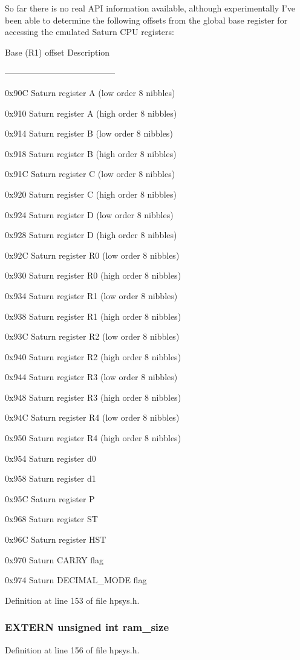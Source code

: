 So far there is no real API information available, although experimentally I've been able to determine the following offsets from the global base register for accessing the emulated Saturn CPU registers:\par


Base (R1) offset Description\par
 ---------------------------------------

0x90C Saturn register A (low order 8 nibbles)\par
 0x910 Saturn register A (high order 8 nibbles)\par
  0x914 Saturn register B (low order 8 nibbles)\par
  0x918 Saturn register B (high order 8 nibbles)\par
  0x91C Saturn register C (low order 8 nibbles)\par
  0x920 Saturn register C (high order 8 nibbles)\par
  0x924 Saturn register D (low order 8 nibbles)\par
  0x928 Saturn register D (high order 8 nibbles)\par
  \par
 0x92C Saturn register R0 (low order 8 nibbles)\par
  0x930 Saturn register R0 (high order 8 nibbles)\par
  0x934 Saturn register R1 (low order 8 nibbles)\par
  0x938 Saturn register R1 (high order 8 nibbles)\par
  0x93C Saturn register R2 (low order 8 nibbles)\par
  0x940 Saturn register R2 (high order 8 nibbles)\par
  0x944 Saturn register R3 (low order 8 nibbles)\par
  0x948 Saturn register R3 (high order 8 nibbles)\par
  0x94C Saturn register R4 (low order 8 nibbles)\par
  0x950 Saturn register R4 (high order 8 nibbles)\par
  \par
 0x954 Saturn register d0\par
 0x958 Saturn register d1\par
 0x95C Saturn register P\par
 0x968 Saturn register ST\par
 0x96C Saturn register HST\par
 0x970 Saturn CARRY flag\par
 0x974 Saturn DECIMAL\_\-MODE flag\par
 

Definition at line 153 of file hpsys.h.
\subsubsection{\setlength{\rightskip}{0pt plus 5cm}EXTERN unsigned int ram\_\-size}\label{hpsys_8h_a5}




Definition at line 156 of file hpsys.h.
